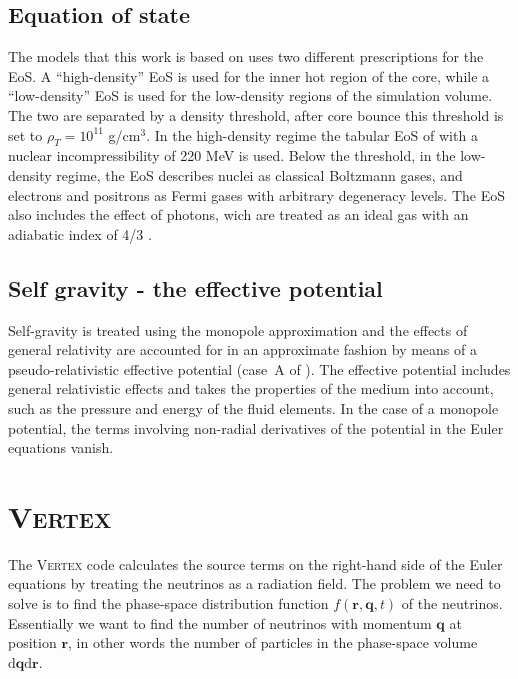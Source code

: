 \subsection{Equation of state}
The models that this work is based on uses two different prescriptions
for the EoS. A ``high-density'' EoS is used for the inner
hot region of the core, while a ``low-density'' EoS is used for the low-density regions of the simulation volume. The two are separated by a density threshold,
after core bounce this threshold is set to $\rho_T = 10^{11}$ g/cm$^3$.
In the high-density regime the tabular EoS of 
\cite{lattimer_91} with a nuclear incompressibility of 220 MeV is used. 
Below the threshold, in the low-density regime, the EoS describes nuclei as
classical Boltzmann gases, and electrons and positrons as Fermi gases with arbitrary degeneracy levels. 
The EoS also includes the effect of photons, wich are treated as an ideal gas with an adiabatic index of 4/3 \citep{janka_99}.

\subsection{Self gravity - the effective potential}
Self-gravity is treated using the monopole                      
approximation and the effects of general relativity are accounted for                                               
in an approximate fashion by means of a pseudo-relativistic                                                          
effective potential (case~A of \cite{marek_06}). 
The effective potential includes general relativistic effects and
takes the properties of the medium into account, such as the pressure and energy
of the fluid elements. In the case of a monopole potential, the terms involving
non-radial derivatives of the potential in the Euler equations vanish.

\section{\textsc{Vertex}}
The \textsc{Vertex} code calculates the source terms on the right-hand side of the
Euler equations by treating the neutrinos as a radiation field. 
The problem we need to solve is to find the phase-space distribution function $f(\mathbf{r},\mathbf{q},t)$ of the neutrinos.
Essentially we want to find the number of neutrinos with momentum $\mathbf{q}$ at position $\mathbf{r}$, in other
words the number of particles in the phase-space volume $\mathrm{d} \mathbf{q} \mathrm{d} \mathbf{r}$.

